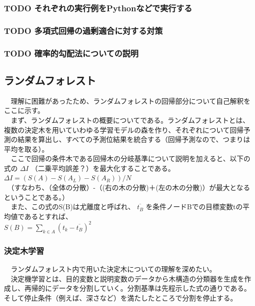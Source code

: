 \documentclass{scrartcl}
\begin{document}
\subsubsection{{\bfseries\sffamily TODO} それぞれの実行例をPythonなどで実行する}
\label{sec:orgb13ec6c}
\subsubsection{{\bfseries\sffamily TODO} 多項式回帰の過剰適合に対する対策}
\label{sec:org877f30b}
\subsubsection{{\bfseries\sffamily TODO} 確率的勾配法についての説明}
\label{sec:org474df59}
\subsection{ランダムフォレスト \cite{random-forest} \cite{random-forest2}}
\label{sec:org451d94e}
　理解に困難があったため、ランダムフォレストの回帰部分について自己解釈をここに示す。\\
　まず、ランダムフォレストの概要についてである。ランダムフォレストとは、複数の決定木を用いていわゆる学習モデルの森を作り、それぞれについて回帰予測の結果を算出し、すべての予測位結果を統合する（回帰予測なので、つまりは平均を取る）。\\
　ここで回帰の条件木である回帰木の分岐基準について説明を加えると、以下の式の \(\Delta I\) （二乗平均誤差？）を最大化することである。\\
 \(\Delta I = (S(A) - S(A_L) - S(A_R)) / N\)\\
 　（すなわち、（全体の分散）-（(右の木の分散)＋(左の木の分散)）が最大となるということである。）\\
 　また、この式のS(B)は尤離度と呼ばれ、 \(\overline{t_B}\) を条件ノードBでの目標変数tの平均値であるとすれば、\\
 \(S(B) = \sum_{k \in A} (t_k - \overline{t_B})^2\)\\
\subsubsection{決定木学習 \cite{define-tree} \cite{matlab0}}
\label{sec:org25f7754}
　ランダムフォレスト内で用いた決定木についての理解を深めたい。\\
　決定機学習とは、目的変数と説明変数のデータから木構造の分類器を生成を作成し、再帰的にデータを分割していく。分割基準は先程示した式の通りである。そして停止条件（例えば、深さなど）を満たしたところで分割を停止する。\\
　\\
\end{document}

